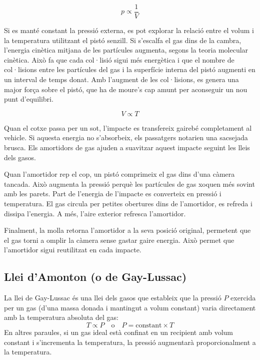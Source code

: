 \begin{mybox}[title=Amortidors]
    \[
    p\propto \frac{1}{V}  
    \]
    
    Si es manté constant la pressió externa, es pot explorar la relació entre el volum i la temperatura utilitzant el pistó senzill. Si s'escalfa el gas dins de la cambra, l'energia cinètica mitjana de les partícules augmenta, segons la teoria molecular cinètica. Això fa que cada col·lisió sigui més energètica i que el nombre de col·lisions entre les partícules del gas i la superfície interna del pistó augmenti en un interval de temps donat. Amb l'augment de les col·lisions, es genera una major força sobre el pistó, que ha de moure's cap amunt per aconseguir un nou punt d'equilibri.

    \[
      V \propto T
      \]

      Quan el cotxe passa per un sot, l'impacte es transfereix gairebé completament al vehicle. Si aquesta energia no s’absorbeix, els passatgers notarien una sacsejada brusca. Els amortidors de gas ajuden a suavitzar aquest impacte seguint les lleis dels gasos.

Quan l’amortidor rep el cop, un pistó comprimeix el gas dins d’una càmera tancada. Això augmenta la pressió perquè les partícules de gas xoquen més sovint amb les parets. Part de l'energia de l'impacte es converteix en pressió i temperatura. El gas circula per petites obertures dins de l’amortidor, es refreda i dissipa l’energia. A més, l’aire exterior refresca l’amortidor.

Finalment, la molla retorna l’amortidor a la seva posició original, permetent que el gas torni a omplir la càmera sense gastar gaire energia. Això permet que l’amortidor sigui reutilitzat en cada impacte.
    
\end{mybox}


      


\subsection{Llei d'Amonton (o de Gay-Lussac)}
La llei de Gay-Lussac és una llei dels gasos que estableix que la pressió \( P \) exercida per un gas (d'una massa donada i mantingut a volum constant) varia directament amb la temperatura absoluta del gas:
\begin{equation}
    T \propto P \quad \text{o} \quad P = \text{constant} \times T
\end{equation}
En altres paraules, si un gas ideal està confinat en un recipient amb volum constant i s'incrementa la temperatura, la pressió augmentarà proporcionalment a la temperatura.

